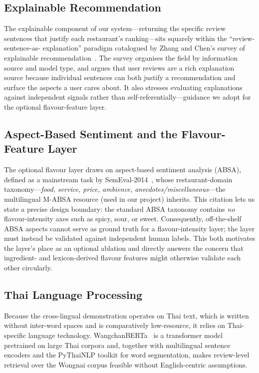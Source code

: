 \subsection{Explainable Recommendation}
The explainable component of our system---returning the specific review sentences that
justify each restaurant's ranking---sits squarely within the ``review-sentence-as-
explanation'' paradigm catalogued by Zhang and Chen's survey of explainable
recommendation~\cite{zhang2020explainable}. The survey organises the field by
information source and model type, and argues that user reviews are a rich explanation
source because individual sentences can both justify a recommendation and surface the
aspects a user cares about. It also stresses evaluating explanations against independent
signals rather than self-referentially---guidance we adopt for the optional
flavour-feature layer.

\subsection{Aspect-Based Sentiment and the Flavour-Feature Layer}
The optional flavour layer draws on aspect-based sentiment analysis (ABSA), defined as a
mainstream task by SemEval-2014~\cite{pontiki2014semeval}, whose restaurant-domain
taxonomy---\emph{food, service, price, ambience, anecdotes/miscellaneous}---the
multilingual M-ABSA resource (used in our project) inherits. This citation lets us state
a precise design boundary: the standard ABSA taxonomy contains \emph{no}
flavour-intensity axes such as spicy, sour, or sweet. Consequently, off-the-shelf ABSA
aspects cannot serve as ground truth for a flavour-intensity layer; the layer must
instead be validated against independent human labels. This both motivates the layer's
place as an optional ablation and directly answers the concern that ingredient- and
lexicon-derived flavour features might otherwise validate each other circularly.

\subsection{Thai Language Processing}
Because the cross-lingual demonstration operates on Thai text, which is written without
inter-word spaces and is comparatively low-resource, it relies on Thai-specific
language technology. WangchanBERTa~\cite{lowphansirikul2021wangchanberta} is a
transformer model pretrained on large Thai corpora and, together with multilingual
sentence encoders and the PyThaiNLP toolkit for word segmentation, makes review-level
retrieval over the Wongnai corpus feasible without English-centric assumptions.
